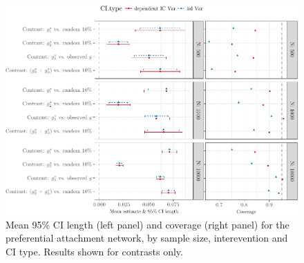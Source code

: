 \documentclass[english]{article}\usepackage[]{graphicx}\usepackage[]{color}
\makeatletter
\def\maxwidth{ %
  \ifdim\Gin@nat@width>\linewidth
    \linewidth
  \else
    \Gin@nat@width
  \fi
}
\newenvironment{knitrout}{}{} %
\theoremstyle{plain}
\theoremstyle{plain}
\makeatother
\begin{document}
\begin{knitrout}\footnotesize
{}\color{fgcolor}\begin{figure}

{\centering \includegraphics[width=\maxwidth]{TablesFigs/knitR-CIres_ATE_prefattach-1} 

}

\caption[Mean 95\% CI length (left panel) and coverage (right panel) for the preferential attachment network, by sample size, interevention and CI type]{Mean 95\% CI length (left panel) and coverage (right panel) for the preferential attachment network, by sample size, interevention and CI type. Results shown for contrasts only.}\label{fig:CIres.ATE.prefattach}
\end{figure}


\end{knitrout}
\end{document}
